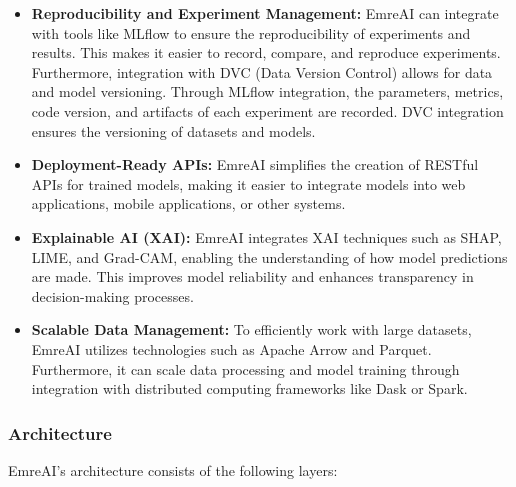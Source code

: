 \documentclass[conference]{IEEEtran}
\begin{document}
\begin{itemize}
    \item \textbf{Reproducibility and Experiment Management:} EmreAI can integrate with tools like MLflow to ensure the reproducibility of experiments and results. This makes it easier to record, compare, and reproduce experiments. Furthermore, integration with DVC (Data Version Control) allows for data and model versioning. Through MLflow integration, the parameters, metrics, code version, and artifacts of each experiment are recorded. DVC integration ensures the versioning of datasets and models.

    \item \textbf{Deployment-Ready APIs:} EmreAI simplifies the creation of RESTful APIs for trained models, making it easier to integrate models into web applications, mobile applications, or other systems.

    \item \textbf{Explainable AI (XAI):} EmreAI integrates XAI techniques such as SHAP, LIME, and Grad-CAM, enabling the understanding of how model predictions are made. This improves model reliability and enhances transparency in decision-making processes.

    \item \textbf{Scalable Data Management:} To efficiently work with large datasets, EmreAI utilizes technologies such as Apache Arrow and Parquet. Furthermore, it can scale data processing and model training through integration with distributed computing frameworks like Dask or Spark.
\end{itemize}


\subsubsection{Architecture}

EmreAI's architecture consists of the following layers:
\end{document}
